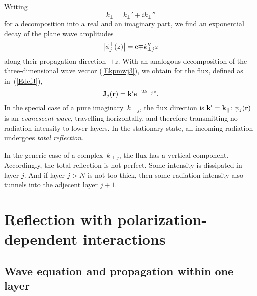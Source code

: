 Writing
\begin{equation}
  k_\perp = k_\perp' + i k_\perp''
\end{equation}
for a decomposition into a real and an imaginary part,
we find an exponential decay of the plane wave amplitudes
\begin{equation}\label{Ephidamp}
  \left|\phi^\pm_j(z)\right|
  = \text{e}{\mp k_{\perp j}'' z}
\end{equation}
along their propagation direction~$\pm z$.
With an analogous decomposition
of the three-dimensional wave vector (\ref{Ekpmwj3}),
we obtain for the flux, defined as in~(\ref{EdefJ}),
\begin{equation}
  \mathbf{J}_j(\mathbf{r}) = \mathbf{k}' \text{e}^{-2k_{\perp j}z}.
\end{equation}
In the special case of a pure imaginary~$k_{\perp j}$,
the flux direction is $\mathbf{k}'=\mathbf{k}_\parallel$:
$\psi_j(\mathbf{r})$ is an \textit{evanescent wave},
%
travelling horizontally,
and therefore transmitting no radiation intensity to lower layers.
In the stationary state,
all incoming radiation undergoes \textit{total reflection}.
%

In the generic case of a complex~$k_{\perp j}$,
the flux has a vertical component.
Accordingly, the total reflection is not perfect.
Some intensity is dissipated in layer $j$.
%
And if layer $j>N$ is not too thick,
then some radiation intensity also tunnels into the adjecent layer $j+1$.
%


\newpage %
\section{Reflection with polarization-dependent interactions}\label{s:pol}



\subsection{Wave equation and propagation within one layer}


